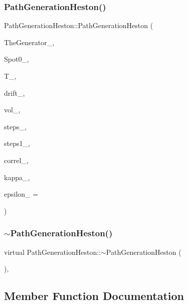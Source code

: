 \subsubsection{\texorpdfstring{Path\+Generation\+Heston()}{PathGenerationHeston()}\hspace{0.1cm}{\footnotesize\ttfamily [2/2]}}
{\footnotesize\ttfamily Path\+Generation\+Heston\+::\+Path\+Generation\+Heston (\begin{DoxyParamCaption}\item[{shared\+\_\+ptr$<$ \hyperlink{classRandomBase}{Random\+Base} $>$}]{The\+Generator\+\_\+,  }\item[{double}]{Spot0\+\_\+,  }\item[{double}]{T\+\_\+,  }\item[{const \hyperlink{classParameters}{Parameters} \&}]{drift\+\_\+,  }\item[{const \hyperlink{classParameters}{Parameters} \&}]{vol\+\_\+,  }\item[{unsigned long}]{steps\+\_\+,  }\item[{unsigned long}]{steps1\+\_\+,  }\item[{double}]{correl\+\_\+,  }\item[{double}]{kappa\+\_\+,  }\item[{double}]{epsilon\+\_\+ = {} }\end{DoxyParamCaption})}

\hypertarget{classPathGenerationHeston_a53aa6464d915516232efa1cb8ae3ef70}{}\label{classPathGenerationHeston_a53aa6464d915516232efa1cb8ae3ef70} 
\subsubsection{\texorpdfstring{$\sim$\+Path\+Generation\+Heston()}{~PathGenerationHeston()}}
{\footnotesize\ttfamily virtual Path\+Generation\+Heston\+::$\sim$\+Path\+Generation\+Heston (\begin{DoxyParamCaption}{ }\end{DoxyParamCaption})\hspace{0.3cm}{\ttfamily [inline]}, {\ttfamily [virtual]}}



\subsection{Member Function Documentation}
\hypertarget{classPathGenerationHeston_ab523f2de8838e845405482b714656015}{}\label{classPathGenerationHeston_ab523f2de8838e845405482b714656015} 
